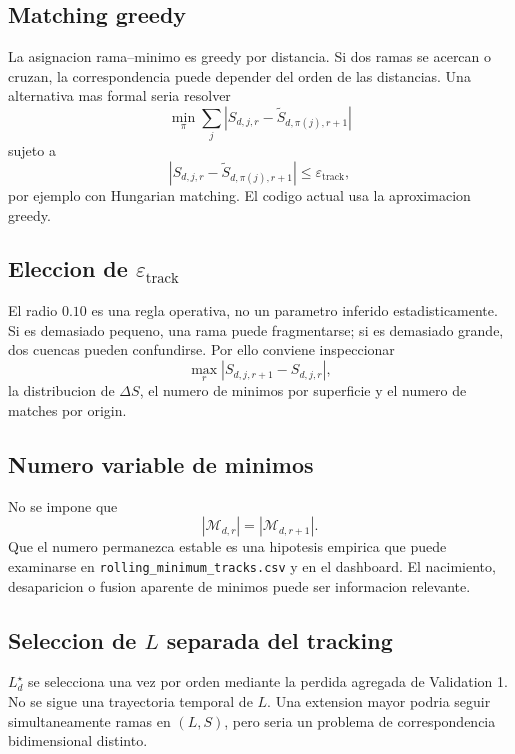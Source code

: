 \documentclass[11pt]{article}
\begin{document}
\subsection{Matching greedy}

La asignacion rama--minimo es greedy por distancia. Si dos ramas se acercan o
cruzan, la correspondencia puede depender del orden de las distancias. Una
alternativa mas formal seria resolver
\begin{equation}
\min_{\pi}
\sum_j
|S_{d,j,r}-\widetilde S_{d,\pi(j),r+1}|
\label{eq:assignment}
\end{equation}
sujeto a
\[
|S_{d,j,r}-\widetilde S_{d,\pi(j),r+1}|
\le
\varepsilon_{\mathrm{track}},
\]
por ejemplo con Hungarian matching. El codigo actual usa la aproximacion
greedy.

\subsection{Eleccion de \(\varepsilon_{\mathrm{track}}\)}

El radio \(0.10\) es una regla operativa, no un parametro inferido
estadisticamente. Si es demasiado pequeno, una rama puede fragmentarse; si es
demasiado grande, dos cuencas pueden confundirse. Por ello conviene inspeccionar
\[
\max_r|S_{d,j,r+1}-S_{d,j,r}|,
\]
la distribucion de \(\Delta S\), el numero de minimos por superficie y el
numero de matches por origin.

\subsection{Numero variable de minimos}

No se impone que
\[
|\mathcal{M}_{d,r}|
=
|\mathcal{M}_{d,r+1}|.
\]
Que el numero permanezca estable es una hipotesis empirica que puede examinarse
en \texttt{rolling\_minimum\_tracks.csv} y en el dashboard. El nacimiento,
desaparicion o fusion aparente de minimos puede ser informacion relevante.

\subsection{Seleccion de \(L\) separada del tracking}

\(L_d^\star\) se selecciona una vez por orden mediante la perdida agregada de
Validation 1. No se sigue una trayectoria temporal de \(L\). Una extension
mayor podria seguir simultaneamente ramas en \((L,S)\), pero seria un problema
de correspondencia bidimensional distinto.
\end{document}
